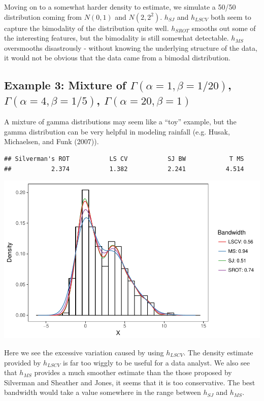 \documentclass[]{article}
\begin{document}
Moving on to a somewhat harder density to estimate, we simulate a 50/50
distribution coming from \(N(0,1)\) and \(N(2, 2^2)\). \(h_{SJ}\) and
\(h_{LSCV}\) both seem to capture the bimodality of the distribution
quite well. \(h_{SROT}\) smooths out some of the interesting features,
but the bimodality is still somewhat detectable. \(h_{MS}\) oversmooths
disastrously - without knowing the underlying structure of the data, it
would not be obvious that the data came from a bimodal distribution.

\subsection{Example 3: Mixture of $\Gamma(\alpha = 1, \beta = 1/20)$, $\Gamma(\alpha = 4, \beta = 1/5)$, $\Gamma(\alpha = 20, \beta = 1)$}

A mixture of gamma distributions may seem like a ``toy'' example, but
the gamma distribution can be very helpful in modeling rainfall (e.g.
Husak, Michaelsen, and Funk (2007)).

\begin{verbatim}
## Silverman's ROT           LS CV           SJ BW            T MS 
##           2.374           1.382           2.241           4.514
\end{verbatim}

\includegraphics{FinalReport_files/figure-latex/unnamed-chunk-7-1.pdf}

Here we see the excessive variation caused by using \(h_{LSCV}\). The
density estimate provided by \(h_{LSCV}\) is far too wiggly to be useful
for a data analyst. We also see that \(h_{MS}\) provides a much smoother
estimate than the those proposed by Silverman and Sheather and Jones, it
seems that it is too conservative. The best bandwidth would take a value
somewhere in the range between \(h_{SJ}\) and \(h_{MS}\).
\end{document}
